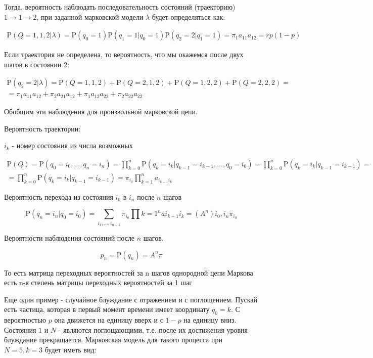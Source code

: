 \documentclass[letterpaper, 11pt]{article}
\newcommand{\prob}{\mathrm{P}}
\begin{document}
Тогда, вероятность наблюдать последовательность состояний (траекторию) $1\to1\to2$, при заданной марковской модели $\lambda$ будет определяться как:

\begin{gather}
\prob(Q=1,1,2|\lambda)=\prob(q_0=1)\prob(q_1=1|q_0=1)\prob(q_2=2|q_1=1)=
\pi_1 a_{11}a_{12}=rp(1-p)
\end{gather}


Если траектория не определена, то вероятность, что мы окажемся после двух шагов в состоянии 2:

\begin{gather}
\prob(q_2=2|\lambda)=\prob(Q=1,1,2)+\prob(Q=2,1,2)+\prob(Q=1,2,2)+\prob(Q=2,2,2)=\\=
\pi_1 a_{11}a_{12}+\pi_2 a_{21}a_{12}+\pi_1 a_{12}a_{22}+\pi_2 a_{22}a_{22}
\end{gather}

Обобщим эти наблюдения для произвольной марковской цепи.

Вероятность траектории:

$i_k$ - номер состояния из числа возможных 

\begin{gather}
\prob(Q)=\prob(q_0=i_0,\ldots,q_n=i_n)=
\prod_{k=0}^n\prob(q_k=i_k|q_{k-1}=i_{k-1},\ldots,q_{0}=i_{0})=
\prod_{k=0}^n\prob(q_k=i_k|q_{k-1}=i_{k-1})=\\=
\prod_{k=0}^n\prob(q_k=i_k|q_{k-1}=i_{k-1})=\pi_{i_0}\prod_{k=1}^n a_{i_{k-1}i_{k}}
\end{gather}

Вероятность перехода из состояния $i_0$ в $i_n$ после $n$ шагов

$$\prob(q_n=i_n|q_0=i_0)=\sum_{i_1,\ldots,i_{n-1}}\pi_{i_0}\prod{k=1}^n a{i_{k-1}i_{k}}=(A^n){i_0,i_n}\pi_{i_0}$$

Вероятности наблюдения состояний после $n$ шагов.

$$p_n=\prob(q_n)=A^n\pi$$

То есть матрица переходных вероятностей за n шагов однородной цепи Маркова есть n-я степень матрицы переходных вероятностей за 1 шаг

Еще один пример - случайное блуждание с отражением и с поглощением. Пускай есть частица, которая в первый момент времени имеет координату $q_0=k$. С вероятностью $p$ она движется на единицу вверх и с $1-p$ на единицу вниз. Состояния $1$ и $N$ - являются поглощающими, т.е. после их достижения уровня блуждание прекращается. Марковская модель для такого процесса при $N=5, k=3$ будет иметь вид:
\end{document}
